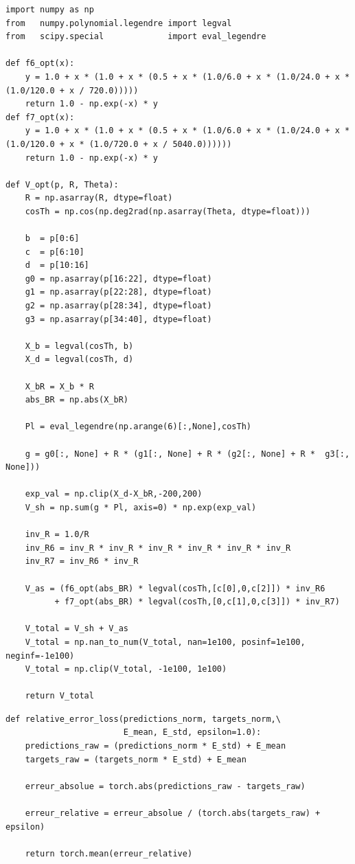 \documentclass[11pt, a4paper, openany]{report}
\begin{document}
\newpage
\begin{lstlisting}[caption={Implémentation optimisée du modèle analytique de V}, label={lst:V_opt}]
import numpy as np
from   numpy.polynomial.legendre import legval
from   scipy.special             import eval_legendre

def f6_opt(x):
    y = 1.0 + x * (1.0 + x * (0.5 + x * (1.0/6.0 + x * (1.0/24.0 + x * (1.0/120.0 + x / 720.0)))))
    return 1.0 - np.exp(-x) * y
def f7_opt(x):
    y = 1.0 + x * (1.0 + x * (0.5 + x * (1.0/6.0 + x * (1.0/24.0 + x * (1.0/120.0 + x * (1.0/720.0 + x / 5040.0))))))
    return 1.0 - np.exp(-x) * y

def V_opt(p, R, Theta):
    R = np.asarray(R, dtype=float)
    cosTh = np.cos(np.deg2rad(np.asarray(Theta, dtype=float)))
    
    b  = p[0:6]
    c  = p[6:10]
    d  = p[10:16]
    g0 = np.asarray(p[16:22], dtype=float)
    g1 = np.asarray(p[22:28], dtype=float)
    g2 = np.asarray(p[28:34], dtype=float)
    g3 = np.asarray(p[34:40], dtype=float)
    
    X_b = legval(cosTh, b)
    X_d = legval(cosTh, d)
    
    X_bR = X_b * R
    abs_BR = np.abs(X_bR)
    
    Pl = eval_legendre(np.arange(6)[:,None],cosTh)

    g = g0[:, None] + R * (g1[:, None] + R * (g2[:, None] + R *  g3[:, None]))  
    
    exp_val = np.clip(X_d-X_bR,-200,200)
    V_sh = np.sum(g * Pl, axis=0) * np.exp(exp_val)

    inv_R = 1.0/R
    inv_R6 = inv_R * inv_R * inv_R * inv_R * inv_R * inv_R
    inv_R7 = inv_R6 * inv_R
    
    V_as = (f6_opt(abs_BR) * legval(cosTh,[c[0],0,c[2]]) * inv_R6
          + f7_opt(abs_BR) * legval(cosTh,[0,c[1],0,c[3]]) * inv_R7)
    
    V_total = V_sh + V_as
    V_total = np.nan_to_num(V_total, nan=1e100, posinf=1e100, neginf=-1e100)
    V_total = np.clip(V_total, -1e100, 1e100)
      
    return V_total
\end{lstlisting}

\newpage
\begin{lstlisting}[caption={Fonction de loss alternative pour le réseau de neurones (Erreur relative)}, label={lst:loss_NN}]
def relative_error_loss(predictions_norm, targets_norm,\
                        E_mean, E_std, epsilon=1.0):
    predictions_raw = (predictions_norm * E_std) + E_mean
    targets_raw = (targets_norm * E_std) + E_mean

    erreur_absolue = torch.abs(predictions_raw - targets_raw)
    
    erreur_relative = erreur_absolue / (torch.abs(targets_raw) + epsilon)
    
    return torch.mean(erreur_relative)
\end{lstlisting}
\end{document}
